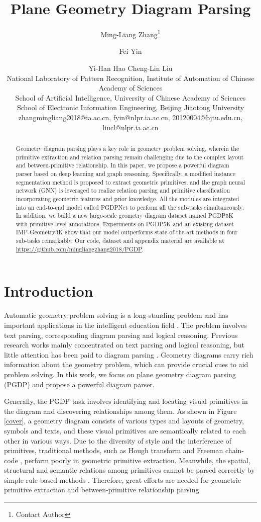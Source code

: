 \documentclass{article}
\title{Plane Geometry Diagram Parsing}
\author{
Ming-Liang Zhang\footnote{Contact Author}\and
Fei Yin\and
Yi-Han Hao\And
Cheng-Lin Liu\\
\affiliations
National Laboratory of Pattern Recognition, Institute of Automation of Chinese Academy of Sciences\\
School of Artificial Intelligence, University of Chinese Academy of Sciences\\
School of Electronic Information Engineering, Beijing Jiaotong University\\
\emails
zhangmingliang2018@ia.ac.cn,
fyin@nlpr.ia.ac.cn,
20120004@bjtu.edu.cn, 
liucl@nlpr.ia.ac.cn
}
\begin{document}
\maketitle

\begin{abstract}
Geometry diagram parsing plays a key role in geometry problem solving, wherein the primitive extraction and relation parsing remain challenging due to the complex layout and between-primitive relationship. In this paper, we propose a powerful diagram parser based on deep learning and graph reasoning. Specifically, a modified instance segmentation method is proposed to extract geometric primitives, and the graph neural network (GNN) is leveraged to realize relation parsing and primitive classification incorporating geometric features and prior knowledge. All the modules are integrated into an end-to-end model called PGDPNet to perform all the sub-tasks simultaneously. In addition, we build a new large-scale geometry diagram dataset named PGDP5K with primitive level annotations. Experiments on PGDP5K and an existing dataset IMP-Geometry3K show that our model outperforms state-of-the-art methods in four sub-tasks remarkably. Our code, dataset and appendix material are available at \url{https://github.com/mingliangzhang2018/PGDP}. 
\end{abstract}

\section{Introduction}

Automatic geometry problem solving is a long-standing problem and has important applications in the intelligent education field \cite{Chou1996,Seo2015,Amini2019}. The problem involves text parsing, corresponding diagram parsing and logical reasoning. Previous research works \cite{Sachan2017,Sachan2020} mainly concentrated on text parsing and logical reasoning, but little attention has been paid to diagram parsing \cite{Seo2014,Lu2021}. Geometry diagrams carry rich information about the geometry problem, which can provide crucial cues to aid problem solving. In this work, we focus on plane geometry diagram parsing (PGDP) and propose a powerful diagram parser.

Generally, the PGDP task involves identifying and locating visual primitives in the diagram and discovering relationships among them. As shown in Figure \ref{cover}, a geometry diagram consists of various types and layouts of geometry, symbols and texts, and these visual primitives are semantically related to each other in various ways. Due to the diversity of style and the interference of primitives, traditional methods, such as Hough transform and Freeman chain-code \cite{Pratt2001}, perform poorly in geometric primitive extraction. Meanwhile, the spatial, structural and semantic relations among primitives cannot be parsed correctly by simple rule-based methods \cite{Seo2014,Lu2021}. Therefore, great efforts are needed for geometric primitive extraction and between-primitive relationship parsing.
\end{document}
